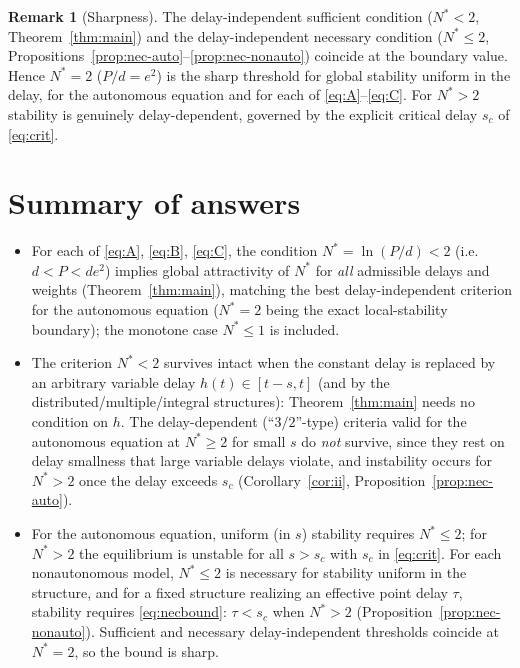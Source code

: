 \documentclass[12pt]{article}
\theoremstyle{definition}
\newtheorem{remark}{Remark}
\begin{document}
\begin{remark}[Sharpness]
The delay-independent sufficient condition ($N^*<2$,
Theorem~\ref{thm:main}) and the delay-independent necessary condition
($N^*\le2$, Propositions~\ref{prop:nec-auto}--\ref{prop:nec-nonauto}) coincide
at the boundary value. Hence $N^*=2$ ($P/d=e^2$) is the sharp threshold for
global stability uniform in the delay, for the autonomous equation and for each
of \eqref{eq:A}--\eqref{eq:C}. For $N^*>2$ stability is genuinely
delay-dependent, governed by the explicit critical delay $s_c$ of
\eqref{eq:crit}.
\end{remark}

\section{Summary of answers}

\begin{itemize}
\item[\textbf{(i)}] For each of \eqref{eq:A}, \eqref{eq:B}, \eqref{eq:C}, the
condition $N^*=\ln(P/d)<2$ (i.e. $d<P<de^2$) implies global attractivity of
$N^*$ for \emph{all} admissible delays and weights (Theorem~\ref{thm:main}),
matching the best delay-independent criterion for the autonomous equation
($N^*=2$ being the exact local-stability boundary); the monotone case
$N^*\le1$ is included.

\item[\textbf{(ii)}] The criterion $N^*<2$ survives intact when the constant
delay is replaced by an arbitrary variable delay $h(t)\in[t-s,t]$ (and by the
distributed/multiple/integral structures): Theorem~\ref{thm:main} needs no
condition on $h$. The delay-dependent (``$3/2$''-type) criteria valid for the
autonomous equation at $N^*\ge2$ for small $s$ do \emph{not} survive, since they
rest on delay smallness that large variable delays violate, and instability
occurs for $N^*>2$ once the delay exceeds $s_c$ (Corollary~\ref{cor:ii},
Proposition~\ref{prop:nec-auto}).

\item[\textbf{(iii)}] For the autonomous equation, uniform (in $s$) stability
requires $N^*\le2$; for $N^*>2$ the equilibrium is unstable for all $s>s_c$ with
$s_c$ in \eqref{eq:crit}. For each nonautonomous model, $N^*\le2$ is necessary
for stability uniform in the structure, and for a fixed structure realizing an
effective point delay $\tau$, stability requires \eqref{eq:necbound}: $\tau<s_c$
when $N^*>2$ (Proposition~\ref{prop:nec-nonauto}). Sufficient and necessary
delay-independent thresholds coincide at $N^*=2$, so the bound is sharp.
\end{itemize}
\end{document}
